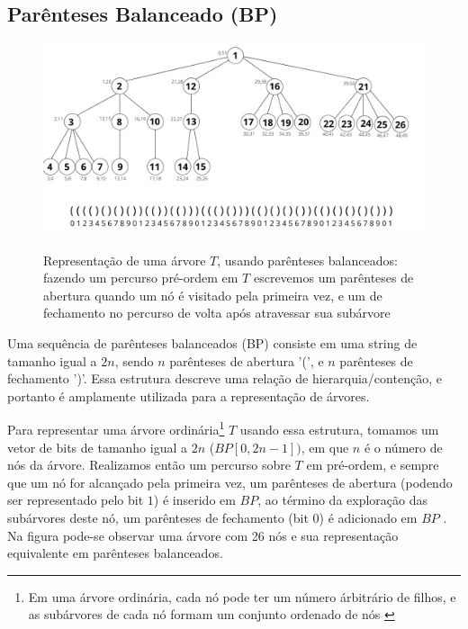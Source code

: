 \subsection{Parênteses Balanceado (BP)}\label{sec:sec-parenthesis-balanceados}
\begin{figure}[!ht]
\centering
  \caption[Representação de árvores com parênteses balanceados]{Representação de uma árvore $T$, usando parênteses balanceados: fazendo um percurso pré-ordem em $T$ escrevemos um parênteses de abertura quando um nó é visitado pela primeira vez, e um de fechamento no percurso de volta após atravessar  sua subárvore \citep{paper-succint-representation-of-balanced-parentheses}}
  \includegraphics[width=\columnwidth]{images/arvore_geral.png}
  \label{fig:parenthesis-representation}
\end{figure}
Uma sequência de parênteses balanceados (BP) consiste em uma string de tamanho igual a $2n$, sendo $n$ parênteses de abertura '(', e $n$ parênteses de fechamento ')'. Essa estrutura descreve uma relação de hierarquia/contenção, e portanto é amplamente utilizada para a representação de árvores.

Para representar uma árvore ordinária\footnote{Em uma árvore ordinária, cada nó pode ter um número árbitrário de filhos, e as subárvores de cada nó formam um conjunto ordenado de nós \citep{tenenbaum}} $T$ usando essa estrutura, tomamos um vetor de bits de tamanho igual a $2n$ ($BP[0,2n-1])$, em que $n$ é o número de nós da árvore. Realizamos então um percurso sobre $T$ em pré-ordem, e sempre que um nó for alcançado pela primeira vez, um parênteses de abertura (podendo ser representado pelo bit $1$) é inserido em $BP$, ao término da exploração das subárvores deste nó, um parênteses de fechamento (bit $0$) é adicionado em $BP$ \citep{paper-succint-trees-in-practice}.  Na figura  pode-se observar uma árvore com 26 nós e sua representação equivalente em parênteses balanceados.


